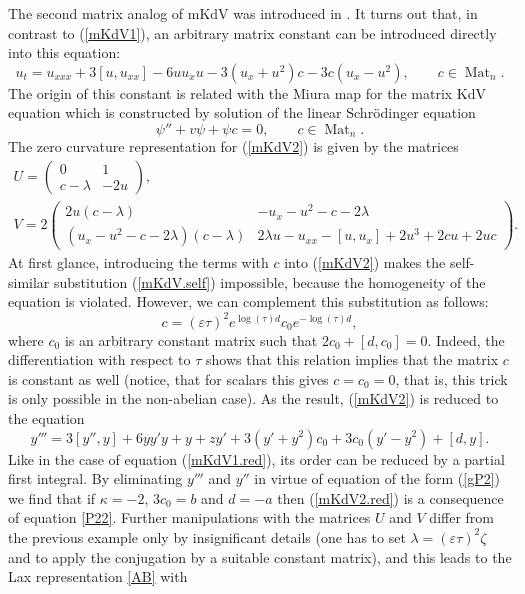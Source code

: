 \documentclass{article}
\theoremstyle{plain}
\theoremstyle{definition}
\DeclareMathOperator{\Mat}{Mat}
\begin{document}
The second matrix analog of mKdV was introduced in \cite{Khalilov_Khruslov_1990}. It turns out that, in contrast to (\ref{mKdV1}), an arbitrary matrix constant can be introduced directly into this equation:
\begin{equation}\label{mKdV2}
 u_t= u_{xxx}+3[u,u_{xx}]-6uu_xu-3(u_x+u^2)c-3c(u_x-u^2),\qquad c\in\Mat_n.
\end{equation}
The origin of this constant is related with the Miura map for the matrix KdV equation which is constructed by solution of the linear Schr\"odinger equation
$$
\psi''+ v \psi + \psi c = 0, \qquad c\in\Mat_n.
$$
The zero curvature representation for (\ref{mKdV2}) is given by the matrices
\begin{gather*}
U=\begin{pmatrix}
  0 & 1\\
  c-\lambda & -2u
 \end{pmatrix},\\[1.5mm]
V=2\begin{pmatrix}
  2u(c-\lambda) & 
  -u_x-u^2-c-2\lambda\\[1mm]
  (u_x-u^2-c-2\lambda)(c-\lambda) & 
  2\lambda u-u_{xx}-[u,u_x]+2u^3+2cu+2uc
 \end{pmatrix}.
\end{gather*}
At first glance, introducing the terms with $c$ into (\ref{mKdV2}) makes the self-similar substitution (\ref{mKdV.self}) impossible, because the homogeneity of the equation is violated. However, we can complement this substitution as follows:
\[
 c=(\varepsilon\tau)^2e^{\log(\tau)d}c_0e^{-\log(\tau)d},
\]
where $c_0$ is an arbitrary constant matrix such that $2c_0+[d,c_0]=0$. Indeed, the differentiation with respect to $\tau$ shows that this relation implies that the matrix $c$ is constant as well (notice, that for scalars this gives $c=c_0=0$, that is, this trick is only possible in the non-abelian case). As the result, (\ref{mKdV2}) is reduced to the equation
\begin{equation}\label{mKdV2.red}
 y'''=3[y'',y]+6yy'y+y+zy'+3(y'+y^2)c_0+3c_0(y'-y^2)+[d,y]. 
\end{equation}
Like in the case of equation (\ref{mKdV1.red}), its order can be reduced by a partial first integral. By eliminating $y'''$ and $y''$ in virtue of equation of the form (\ref{gP2}) we find that if $\kappa=-2$, $3c_0=b$ and $d=-a$ then (\ref{mKdV2.red}) is a consequence of equation \ref{P22}. Further manipulations with the matrices $U$ and $V$ differ from the previous example only by insignificant details (one has to set $\lambda=(\varepsilon\tau)^2\zeta$ and to apply the conjugation by a suitable constant matrix), and this leads to the Lax representation \eqref{AB} with
\end{document}
